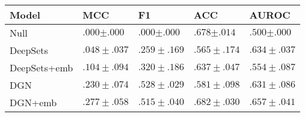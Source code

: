 \begin{tabular}{lllll}
\toprule
Model & \textbf{MCC} & \textbf{F1} & \textbf{ACC} & \textbf{AUROC} \\
\midrule
Null & $.000{\scriptstyle \pm .000}$ & $.000{\scriptstyle \pm .000}$ & $.678{\scriptstyle \pm .014}$ & $.500{\scriptstyle \pm .000}$ \\
DeepSets & $.048\scriptstyle \pm .037$ & $.259\scriptstyle \pm .169$ & $.565\scriptstyle \pm .174$ & $.634\scriptstyle \pm .037$ \\
DeepSets+emb & $.104\scriptstyle \pm .094$ & $.320\scriptstyle \pm .186$ & $.637\scriptstyle \pm .047$ & $.554\scriptstyle \pm .087$ \\
DGN & $.230\scriptstyle \pm .074$ & $\mathbf{.528\scriptstyle \pm .029}$ & $.581\scriptstyle \pm .098$ & $.631\scriptstyle \pm .086$ \\
DGN+emb & $\mathbf{.277\scriptstyle \pm .058}$ & $.515\scriptstyle \pm .040$ & $\mathbf{.682\scriptstyle \pm .030}$ & $\mathbf{.657\scriptstyle \pm .041}$ \\
\bottomrule
\end{tabular}
